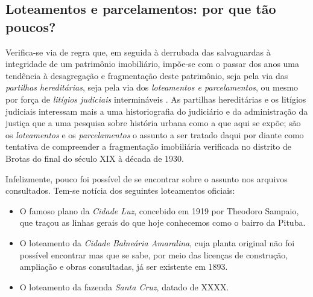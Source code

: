 \subsection{Loteamentos e parcelamentos: por que tão poucos?}\label{subsec:loteamentos}

Verifica-se via de regra que, em seguida à derrubada das salvaguardas à integridade de um patrimônio imobiliário, impõe-se com o passar dos anos uma tendência à desagregação e fragmentação deste patrimônio, seja pela via das \textit{partilhas hereditárias}, seja pela via dos \textit{loteamentos e parcelamentos}, ou mesmo por força de \textit{litígios judiciais} intermináveis \cite{costaporto_sesmaria_1980,sodero_diragrario_1990}. As partilhas hereditárias e os litígios judiciais interessam mais a uma historiografia do judiciário e da administração da justiça que a uma pesquisa sobre história urbana como a que aqui se expõe; são os \textit{loteamentos} e os \textit{parcelamentos} o assunto a ser tratado daqui por diante como tentativa de compreender a fragmentação imobiliária verificada no distrito de Brotas do final do século XIX à década de 1930.

Infelizmente, pouco foi possível de se encontrar sobre o assunto nos arquivos consultados. Tem-se notícia dos seguintes loteamentos oficiais:

\begin{itemize}
\item O famoso plano da \textit{Cidade Luz}, concebido em 1919 por Theodoro Sampaio, que traçou as linhas gerais do que hoje conhecemos como o bairro da Pituba.
\item O loteamento da \textit{Cidade Balneária Amaralina}, cuja planta original não foi possível encontrar mas que se sabe, por meio das licenças de construção, ampliação e obras consultadas, já ser existente em 1893.
\item O loteamento da fazenda \textit{Santa Cruz}, datado de XXXX.
\end{itemize} 


